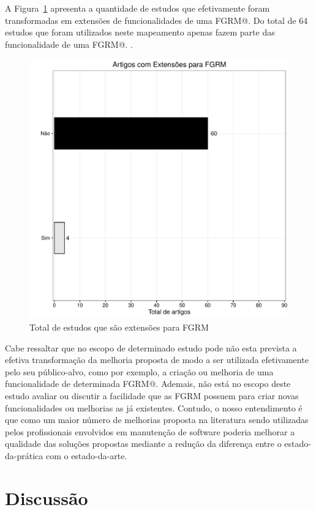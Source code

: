 A Figura~\ref{fig:grafico_virou_extensao} apresenta a quantidade de estudos que
efetivamente foram transformadas em extensões de funcionalidades de uma FGRM@.
Do total de 64 estudos que foram utilizados neste mapeamento apenas fazem parte
das funcionalidade de uma FGRM@. 
. 

\begin{figure}[htpb]
	\centering
	\includegraphics[width=0.8\linewidth]{chapter-mapeamento-sistematico/img/grafico_virou_extensao.pdf}
	\caption{Total de estudos que são extensões para FGRM}
\label{fig:grafico_virou_extensao}
\end{figure}

Cabe ressaltar que no escopo de determinado estudo pode não esta prevista a
efetiva transformação da melhoria proposta de modo a ser utilizada efetivamente
pelo seu público-alvo, como por exemplo, a criação ou melhoria de uma
funcionalidade de determinada FGRM@. Ademais, não está no escopo deste estudo
avaliar ou discutir a facilidade que as FGRM possuem para criar novas
funcionalidades ou melhorias as já existentes. Contudo, o nosso entendimento é
que como um maior número de melhorias proposta na literatura sendo utilizadas
pelos profissionais envolvidos em manutenção de software poderia melhorar a
qualidade das soluções propostas mediante a redução da diferença entre o
estado-da-prática com o estado-da-arte. 

\section{Discussão}
\label{sec:discussao}


